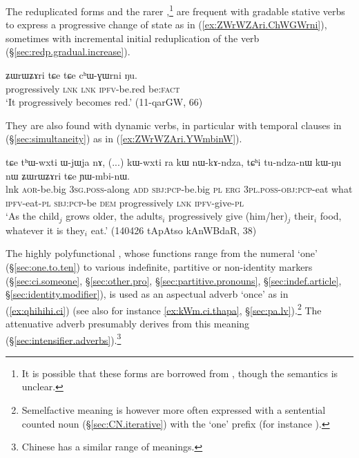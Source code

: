 The reduplicated forms  and the rarer ,\footnote{It is possible that these forms are borrowed from , though the semantics is unclear. } are frequent with gradable stative verbs to express a progressive change of state as in (\ref{ex:ZWrWZAri.ChWGWrni}), sometimes with incremental initial reduplication of the verb (§\ref{sec:redp.gradual.increase}).


\begin{exe}
\ex \label{ex:ZWrWZAri.ChWGWrni}
\gll ʑɯrɯʑɤri tɕe tɕe cʰɯ-ɣɯrni ŋu. \\
progressively \textsc{lnk} \textsc{lnk} \textsc{ipfv}-be.red be:\textsc{fact} \\
\glt `It progressively becomes red.' (11-qarGW, 66)
\end{exe}

They are also found with dynamic verbs, in particular with temporal clauses in  (§\ref{sec:simultaneity}) as in (\ref{ex:ZWrWZAri.YWmbinW}).

\begin{exe}
\ex \label{ex:ZWrWZAri.YWmbinW}
\gll  tɕe tʰɯ-wxti ɯ-jɯja nɤ, (...) kɯ-wxti ra kɯ nɯ-kɤ-ndza, tɕʰi tu-ndza-nɯ kɯ-ŋu nɯ ʑɯrɯʑɤri tɕe ɲɯ-mbi-nɯ. \\
lnk  \textsc{aor}-be.big  \textsc{3sg}.\textsc{poss}-along \textsc{add} {  } \textsc{sbj}:\textsc{pcp}-be.big \textsc{pl} \textsc{erg} \textsc{3pl}.\textsc{poss}-\textsc{obj}:\textsc{pcp}-eat what \textsc{ipfv}-eat-\textsc{pl} \textsc{sbj}:\textsc{pcp}-be \textsc{dem} progressively \textsc{lnk} \textsc{ipfv}-give-\textsc{pl} \\
\glt  `As the child$_j$ grows older, the adults$_i$ progressively give (him/her)$_j$ their$_i$ food, whatever it is they$_i$ eat.' (140426 tApAtso kAnWBdaR, 38)
\end{exe}
 

The highly polyfunctional , whose functions range from the numeral `one' (§\ref{sec:one.to.ten}) to various indefinite, partitive or non-identity markers (§\ref{sec:ci.someone}, §\ref{sec:other.pro}, §\ref{sec:partitive.pronouns}, §\ref{sec:indef.article}, §\ref{sec:identity.modifier}), is used as an aspectual adverb `once' as in (\ref{ex:qhihihi.ci}) (see also for instance \ref{ex:kWm.ci.thapa}, §\ref{sec:pa.lv}).\footnote{Semelfactive meaning is however more often expressed with a sentential counted noun (§\ref{sec:CN.iterative}) with the `one' prefix (for instance ). } The attenuative adverb  presumably derives from this meaning (§\ref{sec:intensifier.adverbs}).\footnote{Chinese  has a similar range of meanings. }


